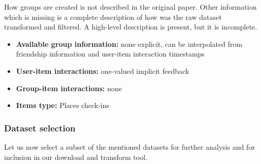 How groups are created is not described in the original paper. Other information which is missing is a complete description of how was the raw dataset transformed and filtered. A high-level description is present, but it is incomplete.


\begin{itemize}
    \item \textbf{Available group information:} none explicit, can be interpolated from friendship information and user-item interaction timestamps
    \item \textbf{User-item interactions:} one-valued implicit feedback
    \item \textbf{Group-item interactions:} none
    \item \textbf{Items type:} Places check-ins
\end{itemize}


\subsubsection{Dataset selection}
Let us now select a subset of the mentioned datasets for further analysis and for inclusion in our download and transform tool.

